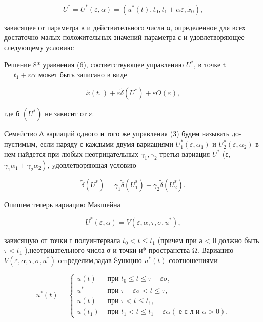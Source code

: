\documentclass[10pt]{article}
\begin{document}
\[
{U}^{ * } = {U}^{ * }\left( {\varepsilon,\alpha }\right)  = \left( {{u}^{ * }\left( t\right),{t}_{0},{t}_{1} + {\alpha \varepsilon },{\widetilde{x}}_{0}}\right),
\]

зависящее от параметра в и действительного числа α, определенное для всех достаточно малых положительных значений параметра ε и удовлетворяющее следующему условию:

Решение 8* уравнения (6), соответствующее управлению \({U}^{ * }\), в точке t = \(= {t}_{1} + {\varepsilon \alpha }\) может быть записано в виде

\[
\widetilde{x}\left( {t}_{1}\right)  + \varepsilon \widetilde{\delta }\left( {U}^{ * }\right)  + {\varepsilon O}\left( \varepsilon \right),
\]

где б \(\left( {U}^{ * }\right)\) не зависит от ε.

Семейство ∆ вариаций одного и того же управления (3) будем называть до- пустимым, если наряду с каждыми двумя вариациями \({U}_{1}^{ * }\left( {\varepsilon,{\alpha }_{1}}\right)\) и \({U}_{2}^{ * }\left( {\varepsilon,{\alpha }_{2}}\right)\) в нем найдется при любых неотрицательных \({\gamma }_{1},{\gamma }_{2}\) третья вариация \({U}^{ * }\) (ε, \(\left. {{\gamma }_{1}{\alpha }_{1} + {\gamma }_{2}{\alpha }_{2}}\right)\), yдовлетворяющая условию

\[
\widetilde{\delta }\left( {U}^{ * }\right)  = {\gamma }_{1}\widetilde{\delta }\left( {U}_{1}^{ * }\right)  + {\gamma }_{2}\widetilde{\delta }\left( {U}_{2}^{ * }\right). \tag{20}
\]

Опишем теперь вариацию Макшейна

\[
{U}^{ * }\left( {\varepsilon,\alpha }\right)  = V\left( {\varepsilon,\alpha,\tau,\sigma,{u}^{ * }}\right),
\]

зависящую от точки τ полуинтервала \({t}_{0} < t \leq  {t}_{1}\) (причем при а < 0 должно быть \(\tau  < {t}_{1}\) ),неотрицательного числа σ и точки и* пространства Ω. Вариацию \(V\left( {\varepsilon,\alpha,\tau,\sigma,{u}^{ * }}\right)\) omределим,задав Šункцию \({u}^{ * }\left( t\right)\) соотношениями

\[
{u}^{ * }\left( t\right)  = \left\{  \begin{array}{ll} u\left( t\right) & \text{ при }{t}_{0} \leq  t \leq  \tau  - {\varepsilon \sigma }, \\  {u}^{ * } & \text{ при }\tau  - {\varepsilon \sigma } < t \leq  \tau, \\  u\left( t\right) & \text{ при }\tau  < t \leq  {t}_{1}, \\  u\left( {t}_{1}\right) & \text{ при }{t}_{1} < t \leq  {t}_{1} + {\varepsilon \alpha }\left( {\operatorname{\text{ е }\text{ с }\text{ л }\text{ и }}\alpha  > 0}\right). \end{array}\right. \tag{21}
\]
\end{document}
